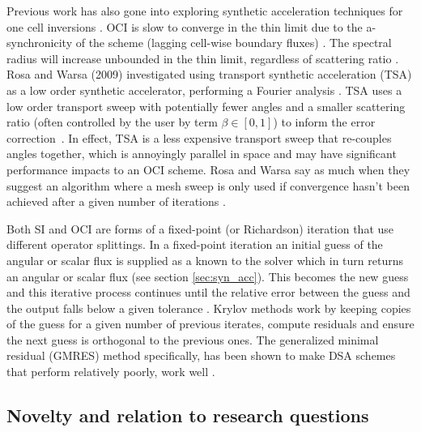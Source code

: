 Previous work has also gone into exploring synthetic acceleration techniques for one cell inversions \cite{ kim_coarse_2000}.
OCI is slow to converge in the thin limit due to the a-synchronicity of the scheme (lagging cell-wise boundary fluxes) \cite{hoagland_hybrid_2021}.
The spectral radius will increase unbounded in the thin limit, regardless of scattering ratio \cite{rosa_cellwise_2013}.
Rosa and Warsa (2009) investigated using transport synthetic acceleration (TSA) as a low order synthetic accelerator, performing a Fourier analysis \cite{tsa2009rosa, tsa_slab2006rosa, tsa_2d2007rosa}.
TSA uses a low order transport sweep with potentially fewer angles and a smaller scattering ratio (often controlled by the user by term $\beta \in [0,1]$) to inform the error correction~\cite{tsa1997gilles}.
In effect, TSA is a less expensive transport sweep that re-couples angles together, which is annoyingly parallel in space and may have significant performance impacts to an OCI scheme.
Rosa and Warsa say as much when they suggest an algorithm where a mesh sweep is only used if convergence hasn't been achieved after a given number of iterations \cite{tsa2009rosa}.

Both SI and OCI are forms of a fixed-point (or Richardson) iteration that use different operator splittings.
In a fixed-point iteration an initial guess of the angular or scalar flux is supplied as a known to the solver which in turn returns an angular or scalar flux (see section \ref{sec:syn_acc}).
This becomes the new guess and this iterative process continues until the relative error between the guess and the output falls below a given tolerance \cite{lewis1984computational}.
Krylov methods work by keeping copies of the guess for a given number of previous iterates, compute residuals and ensure the next guess is orthogonal to the previous ones\cite{gmres1996kelley, patton_application_2002}.
The generalized minimal residual (GMRES) method specifically, has been shown to make DSA schemes that perform relatively poorly, work well \cite{kylov2004warsa, subspace2004warsa}.

\subsection{Novelty and relation to research questions}

